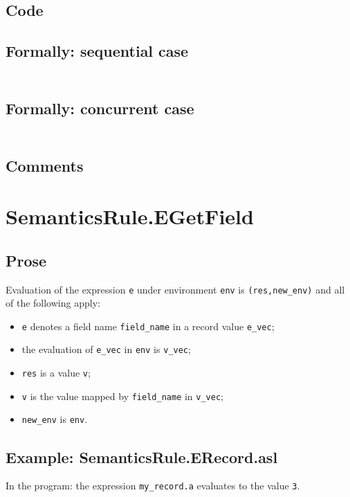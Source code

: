 \documentclass{book}
\begin{document}
  \subsection{Code}

  \subsection{Formally: sequential case}
  \begin{align}
  \end{align} 

  \subsection{Formally: concurrent case}
  \begin{align}
  \end{align} 

  \subsection{Comments}

\section{SemanticsRule.EGetField \label{sec:SemanticsRule.EGetField}}

  \subsection{Prose}
  Evaluation of the expression \texttt{e} under environment \texttt{env} is
  \texttt{(res,new\_env)} and all of the following apply:
  \begin{itemize}
  \item \texttt{e} denotes a field name \texttt{field\_name} in a record value \texttt{e\_vec};
  \item the evaluation of \texttt{e\_vec} in \texttt{env} is \texttt{v\_vec};
  \item \texttt{res} is a value \texttt{v};
  \item \texttt{v} is the value mapped by \texttt{field\_name} in \texttt{v\_vec};
  \item \texttt{new\_env} is \texttt{env}.
  \end{itemize}

  \subsection{Example: SemanticsRule.ERecord.asl}
    In the program:
    the expression \texttt{my\_record.a} evaluates to the value \texttt{3}.
\end{document}
